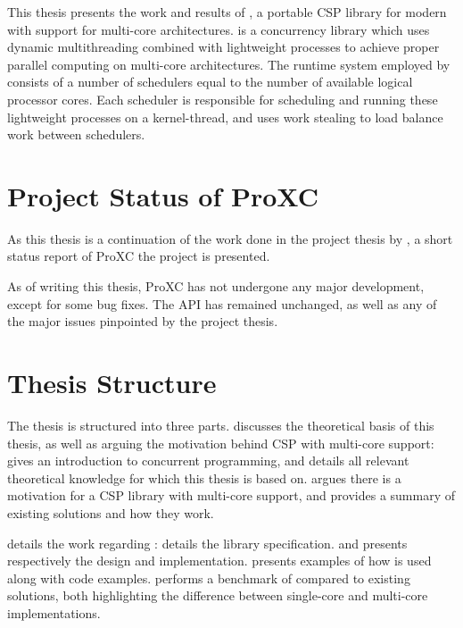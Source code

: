 This thesis presents the work and results of \Proxc{}, a portable CSP library for modern \Cpp{} with support for multi\hyp{}core architectures. \Proxc{} is a concurrency library which uses dynamic multithreading combined with lightweight processes to achieve proper parallel computing on multi\hyp{}core architectures. The runtime system employed by \Proxc{} consists of a number of schedulers equal to the number of available logical processor cores. Each scheduler is responsible for scheduling and running these lightweight processes on a kernel\hyp{}thread, and uses work stealing to load balance work between schedulers.


\section{Project Status of ProXC}

As this thesis is a continuation of the work done in the project thesis by \citet{pettersen2016proxc}, a short status report of ProXC the project is presented.

As of writing this thesis, ProXC has not undergone any major development, except for some bug fixes. The API has remained unchanged, as well as any of the major issues pinpointed by the project thesis. 


\section{Thesis Structure}


The thesis is structured into three parts.  discusses the theoretical basis of this thesis, as well as arguing the motivation behind CSP with multi\hyp{}core support:  gives an introduction to concurrent programming, and details all relevant theoretical knowledge for which this thesis is based on.  argues there is a motivation for a CSP library with multi\hyp{}core support, and provides a summary of existing solutions and how they work.

 details the work regarding \Proxc{}:  details the library specification.  and  presents respectively the design and implementation.  presents examples of how \Proxc{} is used along with code examples.  performs a benchmark of \Proxc{} compared to existing solutions, both highlighting the difference between single\hyp{}core and multi\hyp{}core implementations.

